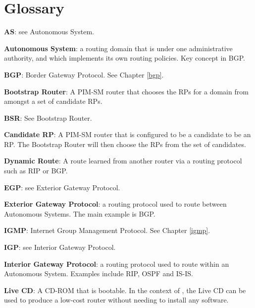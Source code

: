 %
%

\chapter*{Glossary}
\begin{description}

  \item{\bf AS}: see Autonomous System.

  \item{\bf Autonomous System}: a routing domain that is under one
  administrative authority, and which implements its own routing
  policies.  Key concept in BGP.

  \item{\bf BGP}: Border Gateway Protocol.  See Chapter \ref{bgp}.

  \item{\bf Bootstrap Router}: A PIM-SM router that chooses the RPs for
  a domain from amongst a set of candidate RPs.

  \item{\bf BSR}: See Bootstrap Router.

  \item{\bf Candidate RP}: A PIM-SM router that is configured to be a
  candidate to be an RP.  The Bootstrap Router will then choose the
  RPs from the set of candidates.

  \item{\bf Dynamic Route}: A route learned from another router via a
  routing protocol such as RIP or BGP.

  \item{\bf EGP}: see Exterior Gateway Protocol.

  \item{\bf Exterior Gateway Protocol}: a routing protocol used to route
  between Autonomous Systems.  The main example is BGP.

  \item{\bf IGMP}: Internet Group Management Protocol.  See Chapter
  \ref{igmp}.

  \item{\bf IGP}: see Interior Gateway Protocol.

  \item{\bf Interior Gateway Protocol}: a routing protocol used to route
  within an Autonomous System.  Examples include RIP, OSPF and IS-IS.

  \item{\bf Live CD}: A CD-ROM that is bootable.  In the context of
  \xorp, the Live CD can be used to produce a low-cost router without
  needing to install any software.


\end{description}
